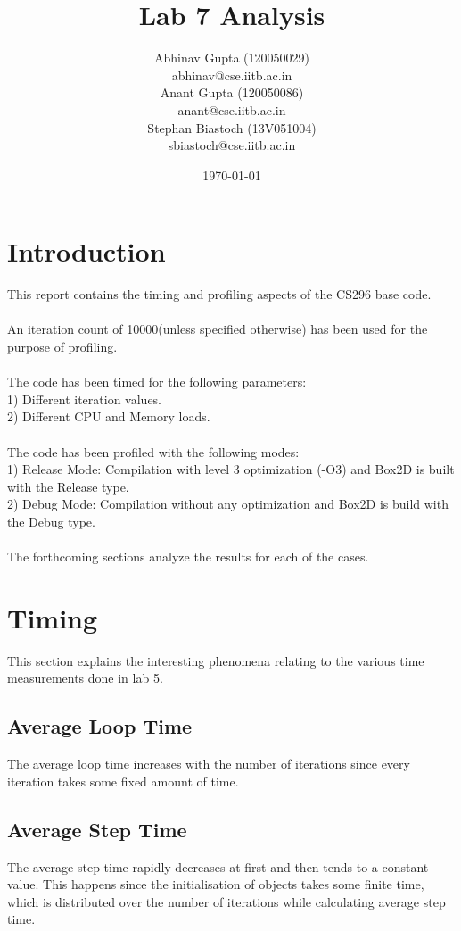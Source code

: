 \documentclass[11pt]{article}
\title{Lab 7 Analysis}
\author{Abhinav Gupta (120050029) \\ abhinav@cse.iitb.ac.in \\ Anant Gupta (120050086) \\anant@cse.iitb.ac.in\\ Stephan Biastoch (13V051004)\\sbiastoch@cse.iitb.ac.in}
\date{\today}
\begin{document}
\maketitle

\section{Introduction}

This report contains the timing and profiling aspects of the CS296 base code. \\
\\
An iteration count of 10000(unless specified otherwise) has been used for the purpose of profiling.
\\
\\
The code has been timed for the following parameters:
\\1) Different iteration values.
\\2) Different CPU and Memory loads. 
\\
\\
The code has been profiled with the following modes:
\\1) Release Mode: Compilation with level 3 optimization (-O3) and Box2D is built with the Release type.
\\2) Debug Mode: Compilation without any optimization and Box2D is build with the Debug type.
\\
\\
The forthcoming sections analyze the results for each of the cases.
\pagebreak

\section{Timing}
This section explains the interesting phenomena relating to the various time measurements done in lab 5.

\subsection{Average Loop Time}
The average loop time increases with the number of iterations since every iteration takes some fixed amount of time.

\subsection{Average Step Time}
The average step time rapidly decreases at first and then tends to a constant value. This happens since the initialisation of objects takes some finite time, which is distributed over the number of iterations while calculating average step time.
\end{document}
